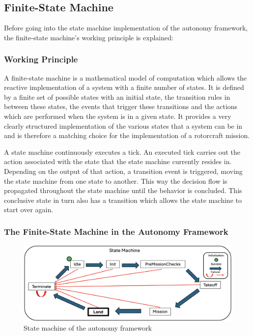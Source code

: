 \subsection{Finite-State Machine}

Before going into the state machine implementation of the autonomy framework, the finite-state machine's working principle is explained:

\subsubsection{Working Principle}

A finite-state machine is a mathematical model of computation which allows the reactive implementation of a system with a finite number of states. It is defined by a finite set of possible states with an initial state, the transition rules in between these states, the events that trigger these transitions and the actions which are performed when the system is in a given state. It provides a very clearly structured implementation of the various states that a system can be in and is therefore a matching choice for the implementation of a rotorcraft mission.

A state machine continuously executes a tick. An executed tick carries out the action associated with the state that the state machine currently resides in. Depending on the output of that action, a transition event is triggered, moving the state machine from one state to another. This way the decision flow is propagated throughout the state machine until the behavior is concluded. This conclusive state in turn also has a transition which allows the state machine to start over again.

\subsubsection{The Finite-State Machine in the Autonomy Framework}

\begin{figure}[ht!]
    \centering
    \includegraphics[scale=0.17]{images/system_overview/state_machine.png}
    \caption{State machine of the autonomy framework}
    \label{fig:state_machine}
\end{figure}


